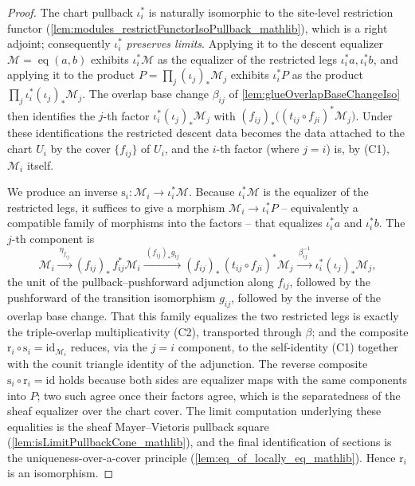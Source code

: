 \begin{proof}
    \leanok
  The chart pullback \(\iota_i^{*}\) is naturally isomorphic to the site-level
  restriction functor (\cref{lem:modules_restrictFunctorIsoPullback_mathlib}), which
  is a right adjoint; consequently \(\iota_i^{*}\) \emph{preserves limits}. Applying
  it to the descent equalizer \(\mathcal{M} = \operatorname{eq}(a,b)\) exhibits
  \(\iota_i^{*}\mathcal{M}\) as the equalizer of the restricted legs
  \(\iota_i^{*}a, \iota_i^{*}b\), and applying it to the product
  \(P = \prod_j (\iota_j)_{*}\mathcal{M}_j\) exhibits \(\iota_i^{*}P\) as the product
  \(\prod_j \iota_i^{*}(\iota_j)_{*}\mathcal{M}_j\). The overlap base change
  \(\beta_{ij}\) of \cref{lem:glueOverlapBaseChangeIso} then identifies the \(j\)-th
  factor \(\iota_i^{*}(\iota_j)_{*}\mathcal{M}_j\) with
  \((f_{ij})_{*}\bigl((t_{ij} \circ f_{ji})^{*}\mathcal{M}_j\bigr)\). Under these
  identifications the restricted descent data becomes the data attached to the chart
  \(U_i\) by the cover \(\{f_{ij}\}\) of \(U_i\), and the \(i\)-th factor (where
  \(j = i\)) is, by (C1), \(\mathcal{M}_i\) itself.

  We produce an inverse \(\mathrm{s}_i : \mathcal{M}_i \to \iota_i^{*}\mathcal{M}\).
  Because \(\iota_i^{*}\mathcal{M}\) is the equalizer of the restricted legs, it
  suffices to give a morphism \(\mathcal{M}_i \to \iota_i^{*}P\) -- equivalently a
  compatible family of morphisms into the factors -- that equalizes
  \(\iota_i^{*}a\) and \(\iota_i^{*}b\). The \(j\)-th component is
  \[
    \mathcal{M}_i
      \xrightarrow{\ \eta_{f_{ij}}\ }
    (f_{ij})_{*}\,f_{ij}^{*}\mathcal{M}_i
      \xrightarrow{\ (f_{ij})_{*} g_{ij}\ }
    (f_{ij})_{*}\,(t_{ij} \circ f_{ji})^{*}\mathcal{M}_j
      \xrightarrow{\ \beta_{ij}^{-1}\ }
    \iota_i^{*}(\iota_j)_{*}\mathcal{M}_j ,
  \]
  the unit of the pullback--pushforward adjunction along \(f_{ij}\), followed by the
  pushforward of the transition isomorphism \(g_{ij}\), followed by the inverse of the
  overlap base change. That this family equalizes the two restricted legs is exactly
  the triple-overlap multiplicativity (C2), transported through \(\beta\); and the
  composite \(\mathrm{r}_i \circ \mathrm{s}_i = \mathrm{id}_{\mathcal{M}_i}\) reduces,
  via the \(j = i\) component, to the self-identity (C1) together with the counit
  triangle identity of the adjunction. The reverse composite
  \(\mathrm{s}_i \circ \mathrm{r}_i = \mathrm{id}\) holds because both sides are
  equalizer maps with the same components into \(P\); two such agree once their
  factors agree, which is the separatedness of the sheaf equalizer over the chart
  cover. The limit computation underlying these equalities is the sheaf
  Mayer--Vietoris pullback square (\cref{lem:isLimitPullbackCone_mathlib}), and the
  final identification of sections is the uniqueness-over-a-cover principle
  (\cref{lem:eq_of_locally_eq_mathlib}). Hence \(\mathrm{r}_i\) is an isomorphism.
\end{proof}

